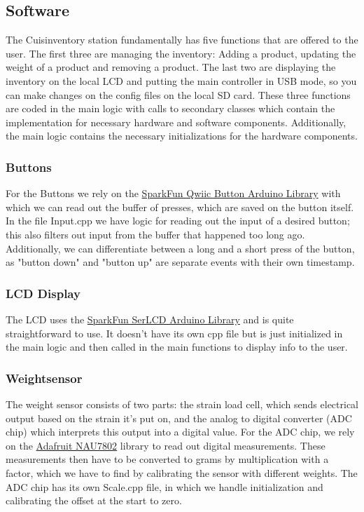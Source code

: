 \documentclass{article}
\begin{document}
\subsection{Software}
The Cuisinventory station fundamentally has five functions that are offered to the user. The first three are managing the inventory: Adding a product, updating the weight of a product and removing a product.
The last two are displaying the inventory on the local LCD and putting the main controller in USB mode, so you can make changes on the config files on the local SD card.
These three functions are coded in the main logic with calls to secondary classes which contain the implementation for necessary hardware and software components.
Additionally, the main logic contains the necessary initializations for the hardware components. 
\subsubsection{Buttons}
For the Buttons we rely on the \href{https://github.com/sparkfun/SparkFun_Qwiic_Button_Arduino_Library}{SparkFun Qwiic Button Arduino Library} with which we can read out the buffer of presses, which are saved on the button itself.
In the file Input.cpp we have logic for reading out the input of a desired button; this also filters out input from the buffer that happened too long ago.
Additionally, we can differentiate between a long and a short press of the button, as "button down" and "button up" are separate events with their own timestamp.
\subsubsection{LCD Display}
The LCD uses the \href{https://github.com/sparkfun/SparkFun_SerLCD_Arduino_Library}{SparkFun SerLCD Arduino Library} and is quite straightforward to use. It doesn't have its own cpp file but is just initialized in the main logic
and then called in the main functions to display info to the user.
\subsubsection{Weightsensor}
The weight sensor consists of two parts: the strain load cell, which sends electrical output based on the strain it's put on, and the analog to digital converter (ADC chip) which interprets this output into a digital value.
For the ADC chip, we rely on the \href{https://github.com/adafruit/Adafruit_NAU7802}{Adafruit NAU7802} library to read out digital measurements.
These measurements then have to be converted to grams by multiplication with a factor, which we have to find by calibrating the sensor with different weights.
The ADC chip has its own Scale.cpp file, in which we handle initialization and calibrating the offset at the start to zero.
\end{document}
